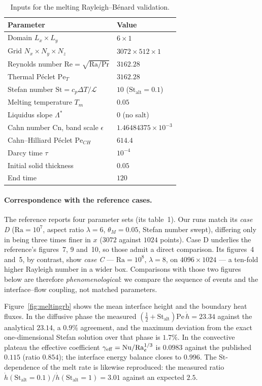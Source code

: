\documentclass[review,12pt]{elsarticle}
\newcommand{\Pet}{\mathrm{Pe}_T}
\newcommand{\Pech}{\mathrm{Pe}_{CH}}
\newcommand{\Ra}{\mathrm{Ra}}
\newcommand{\St}{\mathrm{St}}
\newcommand{\Nu}{\mathrm{Nu}}
\begin{document}
\begin{table}[H]
\centering
\caption{Inputs for the melting Rayleigh--B\'enard validation.}
\label{tab:meltingrb}
\begin{tabular}{l l}
\toprule
Parameter & Value \\
\midrule
Domain $L_x\times L_y$ & $6 \times 1$ \\
Grid $N_x\times N_y\times N_z$ & $3072\times 512\times 1$ \\
Reynolds number $\mathrm{Re}=\sqrt{\Ra/\mathrm{Pr}}$ & $3162.28$ \\
Thermal P\'eclet $\Pet$ & $3162.28$ \\
Stefan number $\St = c_p\Delta T/\mathcal{L}$ & $10$ ($\St_{\mathrm{alt}}=0.1$) \\
Melting temperature $T_m$ & $0.05$ \\
Liquidus slope $\Lambda^{*}$ & $0$ (no salt) \\
Cahn number $\mathrm{Cn}$, band scale $\epsilon$ & $1.46484375\times10^{-3}$ \\
Cahn--Hilliard P\'eclet $\Pech$ & $614.4$ \\
Darcy time $\tau$ & $10^{-4}$ \\
Initial solid thickness & $0.05$ \\
End time & $120$ \\
\bottomrule
\end{tabular}
\end{table}

\paragraph{Correspondence with the reference cases.} The reference reports four
parameter sets (its table~1). Our runs match its \emph{case D}
($\Ra = 10^{7}$, aspect ratio $\lambda = 6$, $\theta_M = 0.05$, Stefan number
swept), differing only in being three times finer in $x$
($3072$ against $1024$ points). Case D underlies the reference's figures~7, 9
and~10, so those admit a direct comparison. Its figures~4 and~5, by contrast,
show \emph{case C} --- $\Ra = 10^{8}$, $\lambda = 8$, on $4096\times1024$ ---
a ten-fold higher Rayleigh number in a wider box. Comparisons with those two
figures below are therefore \emph{phenomenological}: we compare the sequence of
events and the interface--flow coupling, not matched parameters.

Figure~\ref{fig:meltingrb} shows the mean interface height and the boundary heat
fluxes. In the diffusive phase the measured
$(\tfrac12+\St_{\mathrm{alt}})\mathrm{Pe}\,\dot h = 23.34$ against the
analytical $23.14$, a $0.9\%$ agreement, and the maximum deviation from the
exact one-dimensional Stefan solution over that phase is $1.7\%$. In the
convective plateau the effective coefficient
$\gamma_{\rm eff} = \Nu/\Ra_e^{1/3}$ is $0.0983$ against the published $0.115$
(ratio $0.854$); the interface energy balance closes to $0.996$. The
$\St$-dependence of the melt rate is likewise reproduced: the measured ratio
$\dot h(\St_{\mathrm{alt}}{=}0.1)/\dot h(\St_{\mathrm{alt}}{=}1) = 3.01$ against
an expected $2.5$.
\end{document}
